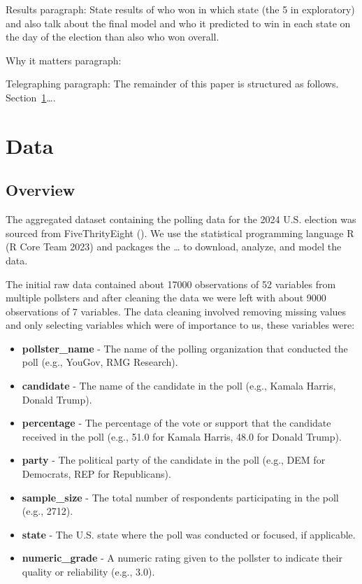 \documentclass[
  letterpaper,
  DIV=11,
  numbers=noendperiod]{scrartcl}
\begin{document}
Results paragraph: State results of who won in which state (the 5 in
exploratory) and also talk about the final model and who it predicted to
win in each state on the day of the election than also who won overall.

Why it matters paragraph:

Telegraphing paragraph: The remainder of this paper is structured as
follows. Section~\ref{sec-data}\ldots.

\section{Data}\label{sec-data}

\subsection{Overview}\label{overview}

The aggregated dataset containing the polling data for the 2024 U.S.
election was sourced from FiveThrityEight (). We use the statistical
programming language R (R Core Team 2023) and packages the \ldots{} to
download, analyze, and model the data.

The initial raw data contained about 17000 observations of 52 variables
from multiple pollsters and after cleaning the data we were left with
about 9000 observations of 7 variables. The data cleaning involved
removing missing values and only selecting variables which were of
importance to us, these variables were:

\begin{itemize}
\item
  \textbf{pollster\_name} - The name of the polling organization that
  conducted the poll (e.g., YouGov, RMG Research).
\item
  \textbf{candidate} - The name of the candidate in the poll (e.g.,
  Kamala Harris, Donald Trump).
\item
  \textbf{percentage} - The percentage of the vote or support that the
  candidate received in the poll (e.g., 51.0 for Kamala Harris, 48.0 for
  Donald Trump).
\item
  \textbf{party} - The political party of the candidate in the poll
  (e.g., DEM for Democrats, REP for Republicans).
\item
  \textbf{sample\_size} - The total number of respondents participating
  in the poll (e.g., 2712).
\item
  \textbf{state} - The U.S. state where the poll was conducted or
  focused, if applicable.
\item
  \textbf{numeric\_grade} - A numeric rating given to the pollster to
  indicate their quality or reliability (e.g., 3.0).
\end{itemize}
\end{document}
